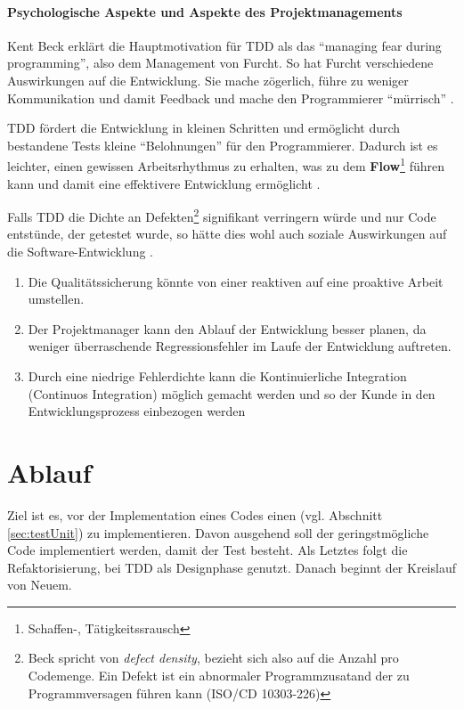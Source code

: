   \paragraph{Psychologische Aspekte und Aspekte des Projektmanagements}

  Kent Beck erklärt die Hauptmotivation für TDD als das "`managing fear during programming"', also dem Management von Furcht. So hat Furcht verschiedene Auswirkungen auf die Entwicklung. Sie mache zögerlich, führe zu weniger Kommunikation und damit Feedback und mache den Programmierer "`mürrisch"' \citep[S. xi]{beck_test_2002}.


  TDD fördert die Entwicklung in kleinen Schritten und ermöglicht durch bestandene Tests kleine "`Belohnungen"' für den Programmierer. Dadurch ist es leichter, einen gewissen Arbeitsrhythmus zu erhalten, was zu dem \textbf{Flow}\footnote{Schaffen-, Tätigkeitssrausch} führen kann und damit eine effektivere Entwicklung ermöglicht \citep{roger_brown_test_2008}.

  Falls TDD die Dichte an Defekten\footnote{Beck spricht von \textit{defect density}, bezieht sich also auf die Anzahl pro Codemenge. Ein Defekt ist ein abnormaler Programmzusatand der zu Programmversagen führen kann (ISO/CD 10303-226)} signifikant verringern würde und nur Code entstünde, der getestet wurde, so hätte dies wohl auch soziale Auswirkungen auf die Software-Entwicklung \citep[S. x]{beck_test_2002}.
  \begin{enumerate}
   \item Die Qualitätssicherung könnte von einer reaktiven auf eine proaktive Arbeit umstellen.
   \item Der Projektmanager kann den Ablauf der Entwicklung besser planen, da weniger überraschende Regressionsfehler im Laufe der Entwicklung auftreten.
   \item Durch eine niedrige Fehlerdichte kann die Kontinuierliche Integration (Continuos Integration) möglich gemacht werden und so der Kunde in den Entwicklungsprozess einbezogen werden
  \end{enumerate}



\section{Ablauf}
Ziel ist es, vor der Implementation eines Codes einen  (vgl. Abschnitt \ref{sec:testUnit}) zu implementieren. Davon ausgehend soll der geringstmögliche Code implementiert werden, damit der Test besteht. Als Letztes folgt die Refaktorisierung, bei TDD als Designphase genutzt. Danach beginnt der Kreislauf von Neuem.

